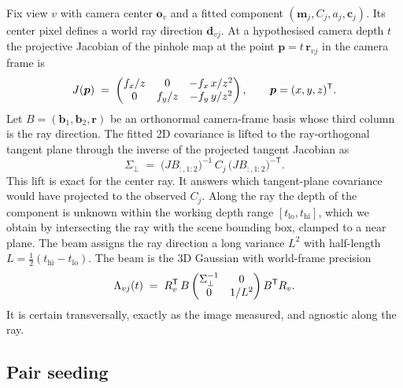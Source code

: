 Fix view $v$ with camera center $\bm{o}_v$ and a fitted component $(\bm{m}_j, C_j, a_j,
\bm{c}_j)$.  Its center pixel defines a world ray direction $\bm{d}_{vj}$.  At a
hypothesised camera depth $t$ the projective Jacobian of the pinhole map at the point
$\bm{p} = t\,\bm{r}_{vj}$ in the camera frame is
\begin{equation}
  J(\bm{p}) \;=\;
  \begin{pmatrix}
    f_x / z & 0 & -f_x\, x / z^2\\
    0 & f_y / z & -f_y\, y / z^2
  \end{pmatrix},
  \qquad \bm{p} = (x, y, z)^{\mathsf{T}} .
  \label{eq:jacobian}
\end{equation}
Let $B = (\bm{b}_1, \bm{b}_2, \bm{r})$ be an orthonormal camera-frame basis whose third
column is the ray direction.  The fitted 2D covariance is lifted to the ray-orthogonal
tangent plane through the inverse of the projected tangent Jacobian as
\begin{equation}
  \Sigma_{\perp}
  \;=\;
  \big(J B_{:,1:2}\big)^{-1}\, C_j\, \big(J B_{:,1:2}\big)^{-\mathsf{T}}.
  \label{eq:tangent-lift}
\end{equation}
This lift is exact for the center ray.  It answers which tangent-plane covariance would
have projected to the observed $C_j$.  Along the ray the depth of the component is
unknown within the working depth range $[t_{\mathrm{lo}}, t_{\mathrm{hi}}]$, which we
obtain by intersecting the ray with the scene bounding box, clamped to a near plane.  The
beam assigns the ray direction a long variance $L^2$ with half-length
$L = \tfrac12 (t_{\mathrm{hi}} - t_{\mathrm{lo}})$.  The beam is the 3D Gaussian with
world-frame precision
\begin{equation}
  \Lambda_{vj}(t)
  \;=\;
  R_v^{\mathsf{T}} \, B \begin{pmatrix} \Sigma_{\perp}^{-1} & 0 \\ 0 & 1/L^2 \end{pmatrix} B^{\mathsf{T}} R_v .
  \label{eq:beam-precision}
\end{equation}
It is certain transversally, exactly as the image measured, and agnostic along the ray.

\subsection{Pair seeding}
\label{sec:seeding}

